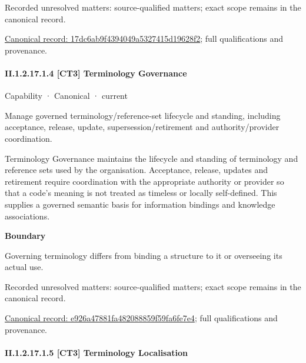 {\small Recorded unresolved matters: source-qualified matters; exact scope remains in the canonical record.}\par
{\footnotesize \href{../../../../../../../continuum/strategy/capability/17dc6ab9f4394049a5327415d19628f2.md}{Canonical record: 17dc6ab9f4394049a5327415d19628f2}; full qualifications and provenance.}\par
\paragraph*{II.1.2.17.1.4 [CT3] Terminology Governance}
\label{navigation:II.1.2.17.1.4}

\label{element:e926a47881fa482088859f59fa6fe7e4}
{\small Capability · Canonical · current}\par

Manage governed terminology/reference-set lifecycle and standing, including acceptance, release, update, supersession/retirement and authority/provider coordination.



Terminology Governance maintains the lifecycle and standing of terminology and reference sets used by the organisation. Acceptance, release, updates and retirement require coordination with the appropriate authority or provider so that a code's meaning is not treated as timeless or locally self-defined. This supplies a governed semantic basis for information bindings and knowledge associations.



\textbf{Boundary}



Governing terminology differs from binding a structure to it or overseeing its actual use.


{\small Recorded unresolved matters: source-qualified matters; exact scope remains in the canonical record.}\par
{\footnotesize \href{../../../../../../../continuum/strategy/capability/e926a47881fa482088859f59fa6fe7e4.md}{Canonical record: e926a47881fa482088859f59fa6fe7e4}; full qualifications and provenance.}\par
\paragraph*{II.1.2.17.1.5 [CT3] Terminology Localisation}
\label{navigation:II.1.2.17.1.5}

